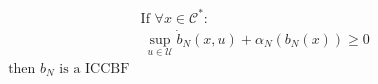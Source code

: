 \documentclass[preview]{standalone}
\begin{document}
\begin{align*}
&\text{If }\forall x \in \mathcal{C}^*:\\ &\ \sup_{u \in \mathcal{U}} \dot b_N(x, u) + \alpha_N(b_N(x)) \geq 0\\ \text{then } b_N \text{ is a ICCBF}
\end{align*}
\end{document}
